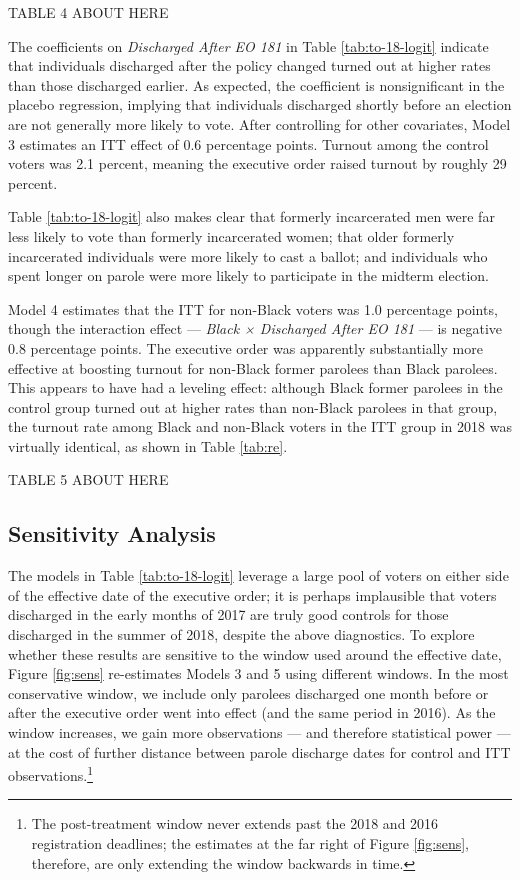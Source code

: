 \documentclass[
  12pt,
]{article}
\begin{document}
TABLE 4 ABOUT HERE

The coefficients on \emph{Discharged After EO 181} in Table \ref{tab:to-18-logit} indicate that individuals discharged after the policy changed turned out at higher rates than those discharged earlier. As expected, the coefficient is nonsignificant in the placebo regression, implying that individuals discharged shortly before an election are not generally more likely to vote. After controlling for other covariates, Model 3 estimates an ITT effect of 0.6 percentage points. Turnout among the control voters was 2.1 percent, meaning the executive order raised turnout by roughly 29 percent.

Table \ref{tab:to-18-logit} also makes clear that formerly incarcerated men were far less likely to vote than formerly incarcerated women; that older formerly incarcerated individuals were more likely to cast a ballot; and individuals who spent longer on parole were more likely to participate in the midterm election.

Model 4 estimates that the ITT for non-Black voters was 1.0 percentage points, though the interaction effect --- \emph{Black × Discharged After EO 181} --- is negative 0.8 percentage points. The executive order was apparently substantially more effective at boosting turnout for non-Black former parolees than Black parolees. This appears to have had a leveling effect: although Black former parolees in the control group turned out at higher rates than non-Black parolees in that group, the turnout rate among Black and non-Black voters in the ITT group in 2018 was virtually identical, as shown in Table \ref{tab:re}.

TABLE 5 ABOUT HERE

\hypertarget{sensitivity-analysis}{%
\subsection*{Sensitivity Analysis}\label{sensitivity-analysis}}

The models in Table \ref{tab:to-18-logit} leverage a large pool of voters on either side of the effective date of the executive order; it is perhaps implausible that voters discharged in the early months of 2017 are truly good controls for those discharged in the summer of 2018, despite the above diagnostics. To explore whether these results are sensitive to the window used around the effective date, Figure \ref{fig:sens} re-estimates Models 3 and 5 using different windows. In the most conservative window, we include only parolees discharged one month before or after the executive order went into effect (and the same period in 2016). As the window increases, we gain more observations --- and therefore statistical power --- at the cost of further distance between parole discharge dates for control and ITT observations.\footnote{The post-treatment window never extends past the 2018 and 2016 registration deadlines; the estimates at the far right of Figure \ref{fig:sens}, therefore, are only extending the window backwards in time.}
\end{document}
